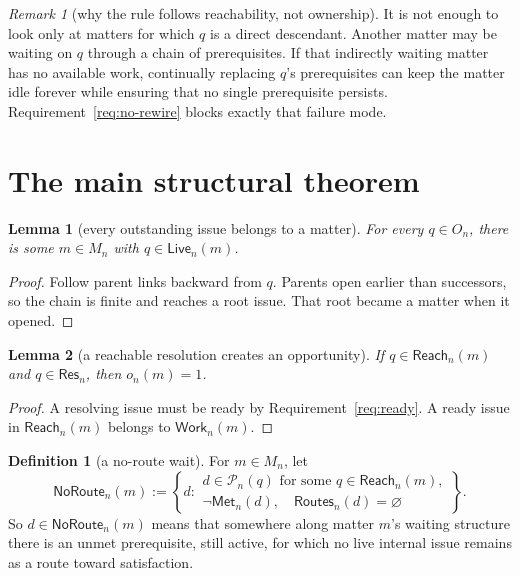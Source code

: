 \documentclass[11pt]{article}
\newtheorem{lemma}{Lemma}
\theoremstyle{definition}
\newtheorem*{definition}{Definition}
\theoremstyle{remark}
\newtheorem*{remark}{Remark}
\newcommand{\Met}{\mathsf{Met}}
\newcommand{\Pre}{\mathcal P}
\newcommand{\Live}{\mathsf{Live}}
\newcommand{\Routes}{\mathsf{Routes}}
\newcommand{\Reach}{\mathsf{Reach}}
\newcommand{\Work}{\mathsf{Work}}
\newcommand{\NoRoute}{\mathsf{NoRoute}}
\newcommand{\ResSet}{\mathsf{Res}}
\begin{document}
\begin{remark}[why the rule follows reachability, not ownership]
It is not enough to look only at matters for which $q$ is a direct descendant.
Another matter may be waiting on $q$ through a chain of prerequisites. If that
indirectly waiting matter has no available work, continually replacing $q$'s
prerequisites can keep the matter idle forever while ensuring that no single
prerequisite persists. Requirement~\ref{req:no-rewire} blocks exactly that
failure mode.
\end{remark}

\section{The main structural theorem}\label{sec:main}

\begin{lemma}[every outstanding issue belongs to a matter]\label{lem:root-matter}
For every $q\in O_n$, there is some $m\in M_n$ with $q\in\Live_n(m)$.
\end{lemma}

\begin{proof}
Follow parent links backward from $q$. Parents open earlier than successors, so
the chain is finite and reaches a root issue. That root became a matter when it
opened.
\end{proof}

\begin{lemma}[a reachable resolution creates an opportunity]\label{lem:resolution-opportunity}
If $q\in\Reach_n(m)$ and $q\in\ResSet_n$, then $o_n(m)=1$.
\end{lemma}

\begin{proof}
A resolving issue must be ready by Requirement~\ref{req:ready}. A ready issue
in $\Reach_n(m)$ belongs to $\Work_n(m)$.
\end{proof}

\begin{definition}[a no-route wait]
For $m\in M_n$, let
\[
 \NoRoute_n(m):=
 \left\{d:\begin{array}{l}
 d\in\Pre_n(q)\text{ for some }q\in\Reach_n(m),\\
 \neg\Met_n(d),\quad\Routes_n(d)=\varnothing
 \end{array}\right\}.
\]
So $d\in\NoRoute_n(m)$ means that somewhere along matter $m$'s waiting
structure there is an unmet prerequisite, still active, for which no live
internal issue remains as a route toward satisfaction.
\end{definition}
\end{document}
